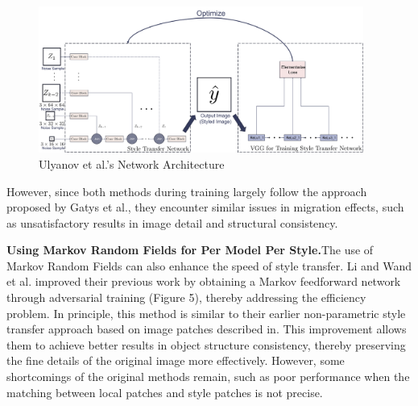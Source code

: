 \documentclass[preprint,12pt]{elsarticle}
\begin{document}
\begin{figure}[!htbp]%
    \centering%
    \includegraphics[width=0.95\textwidth]{Figure_5__Ulyanov_et_al_Network_Architecture.pdf}
    \caption{Ulyanov et al.'s Network Architecture\citep{23ulyanov2016texture}}\label{fig5_Ulyanov}
\end{figure}

However, since both methods during training largely follow the approach proposed by Gatys et al., they encounter similar issues in migration effects, such as unsatisfactory results in image detail and structural consistency.

\textbf{Using Markov Random Fields for Per Model Per Style.}\quad The use of Markov Random Fields can also enhance the speed of style transfer. Li and Wand et al.\citep{35li2016precomputed} improved their previous work\citep{33li2016combining} by obtaining a Markov feedforward network through adversarial training (Figure 5), thereby addressing the efficiency problem. In principle, this method is similar to their earlier non-parametric style transfer approach based on image patches described in\citep{33li2016combining}. This improvement allows them to achieve better results in object structure consistency, thereby preserving the fine details of the original image more effectively. However, some shortcomings of the original methods remain, such as poor performance when the matching between local patches and style patches is not precise.
\end{document}
